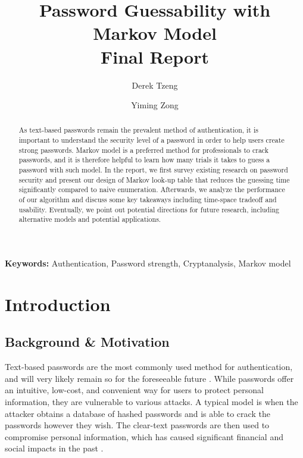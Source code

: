 \documentclass{article} %
\title{Password Guessability with Markov Model\\Final Report}
\author[1]{Derek Tzeng}
\author[1]{Yiming Zong}
\affil[1]{School of Computer Science, Carnegie Mellon University}
\theoremstyle{definition}
\theoremstyle{theorem}
\theoremstyle{remark}
\theoremstyle{remark}
\begin{document}
\maketitle

\begin{abstract}
    \par\quad As text-based passwords remain the prevalent method of authentication, it is important to understand the security level of a password in order to help users create strong passwords. Markov model is a preferred method for professionals to crack passwords, and it is therefore helpful to learn how many trials it takes to guess a password with such model. In the report, we first survey existing research on password security and present our design of Markov look-up table that reduces the guessing time significantly compared to naive enumeration. Afterwards, we analyze the performance of our algorithm and discuss some key takeaways including time-space tradeoff and usability. Eventually, we point out potential directions for future research, including alternative models and potential applications.
\end{abstract}

\textbf{Keywords:} Authentication, Password strength, Cryptanalysis, Markov model
\vspace{\fill}
\pagebreak

\section{Introduction}

\subsection{Background \& Motivation}
\par\quad Text-based passwords are the most commonly used method for authentication, and will very likely remain so for the foreseeable future \cite{persistence}. While passwords offer an intuitive, low-cost, and convenient way for users to protect personal information, they are vulnerable to various attacks. A typical model is when the attacker obtains a database of hashed passwords and is able to crack the passwords however they wish. The clear-text passwords are then used to compromise personal information, which has caused significant financial and social impacts in the past \cite{money}.
\end{document}

